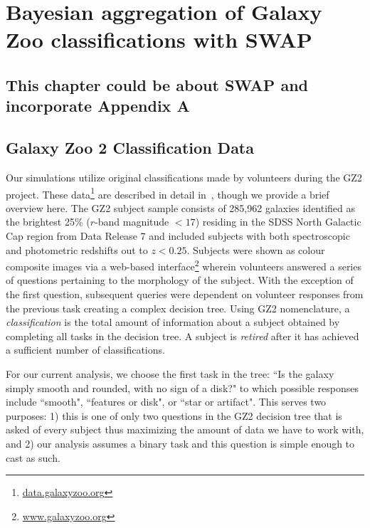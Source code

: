 
\chapter{Bayesian aggregation of Galaxy Zoo classifications with SWAP}
\label{chap:1}


\section{This chapter could be about SWAP and incorporate Appendix A}



\section{Galaxy Zoo 2 Classification Data} \label{sec: data}

Our simulations utilize original classifications made by volunteers during the
 GZ2 project. These data\footnote{\url{data.galaxyzoo.org}} are described in detail
 in~\cite{Willett2013}, though we provide a brief overview here.  The GZ2 subject sample
 consists of 285,962 galaxies identified as the brightest 25\% ($r$-band magnitude $< 17$)
 residing in the SDSS North Galactic Cap region from Data Release 7 and included 
subjects with both spectroscopic and photometric redshifts out to $z < 0.25$.
Subjects were shown as colour composite images via a web-based
 interface\footnote{\url{www.galaxyzoo.org}} wherein volunteers answered a 
series of questions pertaining to the morphology of the subject. With the exception 
of the first question, subsequent queries were dependent on volunteer responses 
from the previous task creating a complex decision tree. Using GZ2 nomenclature, 
 a \textit{classification} is the total amount of information about a subject 
obtained by completing all tasks in the decision tree. A subject is \textit{retired} 
after it has achieved a sufficient number of classifications.


For our current analysis, we choose the first task in the tree: ``Is the galaxy simply 
smooth and rounded, with no sign of a disk?" to which possible responses include 
``smooth", ``features or disk", or ``star or artifact". This  serves 
two purposes: 1) this is one of only two questions in the GZ2 decision tree that 
is asked of every subject thus maximizing the amount of data we have to work with, 
and 2) our analysis assumes a binary task and this question is simple enough to cast as such.

